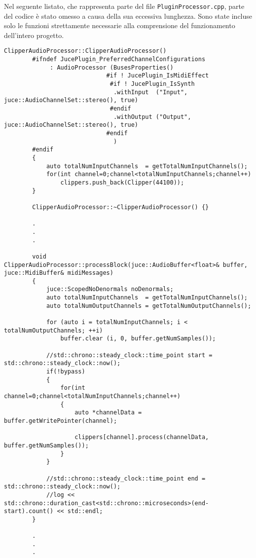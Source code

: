 	Nel seguente listato, che rappresenta parte del file \texttt{PluginProcessor.cpp}, parte del codice è stato omesso a causa della sua eccessiva lunghezza. Sono state incluse solo le funzioni strettamente necessarie alla comprensione del funzionamento dell'intero progetto.
	\begin{lstlisting}[caption={PluginProcessor.cpp},label=code:PluginProcessor.cpp,style=code,style=cpp,language=cppl,gobble=8]
		ClipperAudioProcessor::ClipperAudioProcessor()
		#ifndef JucePlugin_PreferredChannelConfigurations
		     : AudioProcessor (BusesProperties()
		                     #if ! JucePlugin_IsMidiEffect
		                      #if ! JucePlugin_IsSynth
		                       .withInput  ("Input",  juce::AudioChannelSet::stereo(), true)
		                      #endif
		                       .withOutput ("Output", juce::AudioChannelSet::stereo(), true)
		                     #endif
		                       )
		#endif
		{
			auto totalNumInputChannels  = getTotalNumInputChannels();
			for(int channel=0;channel<totalNumInputChannels;channel++)
				clippers.push_back(Clipper(44100));
		}

		ClipperAudioProcessor::~ClipperAudioProcessor() {}
		
		.
		.
		.
		
		void ClipperAudioProcessor::processBlock(juce::AudioBuffer<float>& buffer, juce::MidiBuffer& midiMessages)
		{
			juce::ScopedNoDenormals noDenormals;
			auto totalNumInputChannels  = getTotalNumInputChannels();
			auto totalNumOutputChannels = getTotalNumOutputChannels();

			for (auto i = totalNumInputChannels; i < totalNumOutputChannels; ++i)
				buffer.clear (i, 0, buffer.getNumSamples());

			//std::chrono::steady_clock::time_point start = std::chrono::steady_clock::now();
			if(!bypass)
			{
				for(int channel=0;channel<totalNumInputChannels;channel++)
				{
					auto *channelData = buffer.getWritePointer(channel);
					
					clippers[channel].process(channelData, buffer.getNumSamples());
				}
			}
			
			//std::chrono::steady_clock::time_point end = std::chrono::steady_clock::now();
			//log << std::chrono::duration_cast<std::chrono::microseconds>(end-start).count() << std::endl;
		}
		
		.
		.
		.
	\end{lstlisting}
	\vspace{10px}
	
